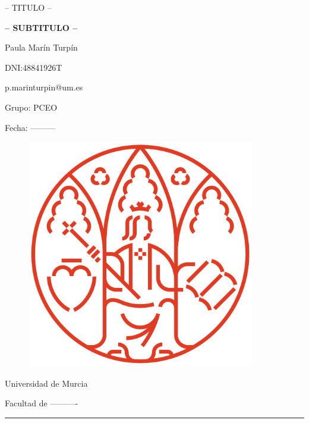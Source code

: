 \begin{titlepage}
    \begin{center}
        {\Huge \textsc{-- TITULO --}}
        
        {\Large{\textbf{-- SUBTITULO --}}}
        
        \vspace{15mm}
        {\large{ 
          Paula Marín Turpín
          
          DNI:48841926T

          p.marinturpin@um.es          
          
          Grupo: PCEO
          
          Fecha: --------- 
          }}

          \vspace{15mm}
        \begin{figure}[ht]
             \centerline{\includegraphics[width=10cm,height=10cm]{portada/nuevo_logo_umu.png}}
            \label{logo_umu}
        \end{figure}

        \vspace{15mm}
        {\large {Universidad de Murcia}}
        
        {\large {Facultad de ----------}}
        \textcolor{rojo}{\rule{\linewidth}{0.55mm}}
    \end{center}
\end{titlepage}